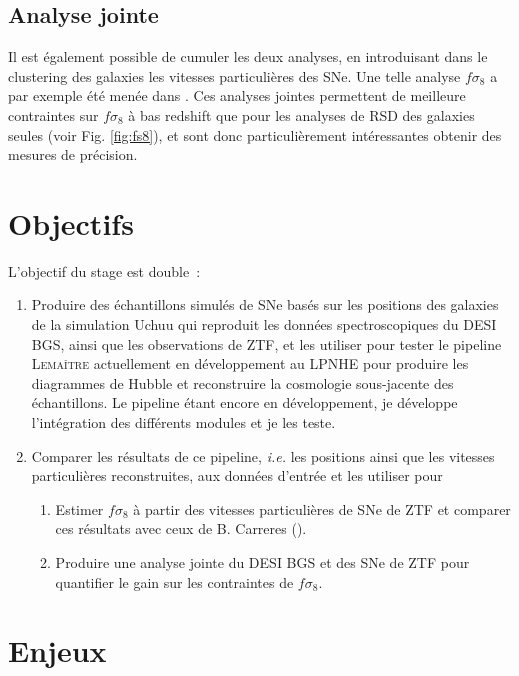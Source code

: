 \documentclass{book}
\def\lemaitre{\textsc{Lemaître}\xspace}
\begin{document}
\subsection{Analyse jointe }

Il est également possible de cumuler les deux analyses, en introduisant dans le clustering des galaxies les vitesses particulières des SNe. Une telle analyse $f\sigma_8$ a par exemple été menée dans \cite{boruah_bayesian_2022, stahl_peculiar-velocity_2021}. Ces analyses jointes permettent de meilleure contraintes sur $f\sigma_8$ à bas redshift que pour les analyses de RSD des galaxies seules (voir Fig. \ref{fig:fs8}), et sont donc particulièrement intéressantes obtenir des mesures de précision.

\section{Objectifs}

L'objectif du stage est double~:
\begin{enumerate}
    \item Produire des échantillons simulés de SNe basés sur les positions des galaxies de la simulation Uchuu qui reproduit les données spectroscopiques du DESI BGS, ainsi que les observations de ZTF, et les utiliser pour tester le pipeline \lemaitre actuellement en développement au LPNHE pour produire les diagrammes de Hubble et reconstruire la cosmologie sous-jacente des échantillons. Le pipeline étant encore en développement, je développe l'intégration des différents modules et je les teste.
    \item Comparer les résultats de ce pipeline, \textit{i.e.} les positions ainsi que les vitesses particulières reconstruites, aux données d'entrée et les utiliser pour
    	\begin{enumerate}
		\item Estimer $f \sigma_8$ à partir des vitesses particulières de SNe de ZTF et comparer ces résultats avec ceux de B. Carreres (\cite{carreres_growth-rate_2023}).
		\item Produire une analyse jointe du DESI BGS et des SNe de ZTF pour quantifier le gain sur les contraintes de $f\sigma_8$.
	\end{enumerate}
\end{enumerate}

\section{Enjeux}
\end{document}
